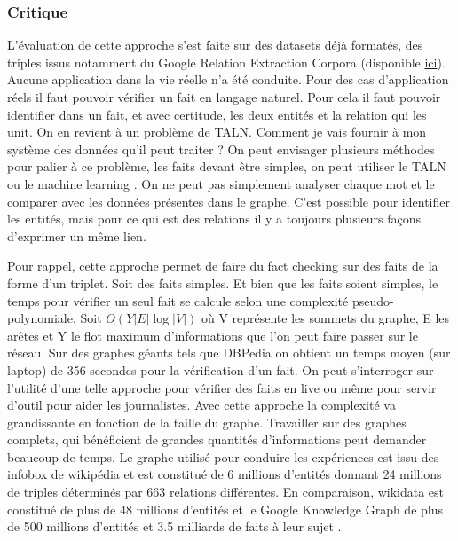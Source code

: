 \subsubsection{Critique}

L'évaluation de cette approche s'est faite sur des datasets déjà formatés, des triples issus notamment du Google Relation Extraction Corpora
(disponible \href{https://github.com/google-research-datasets/relation-extraction-corpus}{ici}). Aucune application dans la vie réelle n'a été conduite. Pour des cas d'application réels il faut pouvoir vérifier un fait en langage naturel. Pour cela il faut pouvoir identifier dans un fait, et avec certitude, les deux entités et la relation qui les unit. On en revient à un problème de TALN. Comment je vais fournir à mon système des données qu'il peut traiter ? On peut envisager plusieurs méthodes pour palier à ce problème, les faits devant être simples, on peut utiliser le TALN ou le machine learning \cite{googleai}. On ne peut pas simplement analyser chaque mot et le comparer avec les données présentes dans le graphe. C'est possible pour identifier les entités, mais pour ce qui est des relations il y a toujours plusieurs façons d'exprimer un même lien.

Pour rappel, cette approche permet de faire du fact checking sur des faits de la forme d'un triplet. Soit des faits simples. Et bien que les faits soient simples, le temps pour vérifier un seul fait se calcule selon une complexité pseudo-polynomiale. Soit $ O(Y|E|\log |V|)$ où V représente les sommets du graphe, E les arêtes et Y le flot maximum d'informations que l'on peut faire passer sur le réseau. Sur des graphes géants tels que DBPedia on obtient un temps moyen (sur laptop) de 356 secondes pour la vérification d'un fait. On peut s'interroger sur l'utilité d'une telle approche pour vérifier des faits en live ou même pour servir d'outil pour aider les journalistes. Avec cette approche la complexité va grandissante en fonction de la taille du graphe. Travailler sur des graphes complets, qui bénéficient de grandes quantités d'informations peut demander beaucoup de temps. Le graphe utilisé pour conduire les expériences est issu des infobox de wikipédia et est constitué de 6 millions d'entités donnant 24 millions de triples déterminés par 663 relations différentes. En comparaison, wikidata est constitué de plus de 48 millions d'entités \cite{wikidata:statistics} \cite{wikidata:statistics2} et le Google Knowledge Graph de plus de 500 millions d'entités et 3.5 milliards de faits à leur sujet \cite{google:kg}.

